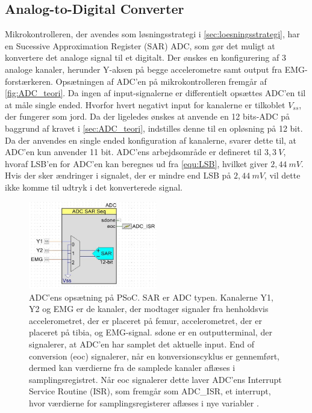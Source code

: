 \subsection{Analog-to-Digital Converter} \label{sec:ADC_imp}
Mikrokontrolleren, der avendes som løsningsstrategi i \autoref{sec:loesningsstrategi}, har en Sucessive Approximation Register (SAR) ADC, som gør det muligt at konvertere det analoge signal til et digitalt. Der ønskes en konfigurering af 3 analoge kanaler, herunder Y-aksen på begge accelerometre samt output fra EMG-forstærkeren. Opsætningen af ADC'en på mikrokontrolleren fremgår af \autoref{fig:ADC_teori}. Da ingen af input-signalerne er differentielt opsættes ADC'en til at måle single ended. Hvorfor hvert negativt input for kanalerne er tilkoblet $V_{ss}$, der fungerer som jord. Da der ligeledes ønskes at anvende en 12 bits-ADC på baggrund af kravet i \autoref{sec:ADC_teori}, indstilles denne til en opløsning på 12 bit. Da der anvendes en single ended konfiguration af kanalerne, svarer dette til, at ADC'en kun anvender 11 bit. ADC'ens arbejdsområde er defineret til $3,3~V$, hvoraf  LSB'en for ADC'en kan beregnes ud fra \autoref{equ:LSB}, hvilket giver $2,44~mV$. Hvis der sker ændringer i signalet, der er mindre end LSB på $2,44~mV$, vil dette ikke komme til udtryk i det konverterede signal. 


\begin{figure}[H]
\centering
\includegraphics[width=0.5\textwidth]{figures/implementering/ADC_imp.jpg}
\caption{ADC'ens opsætning på PSoC. SAR er ADC typen. Kanalerne Y1, Y2 og EMG er de kanaler, der modtager signaler fra henholdsvis accelerometret, der er placeret på femur, accelerometret, der er placeret på tibia, og EMG-signal. sdone er en outputterminal, der signalerer, at ADC'en har samplet det aktuelle input. End of conversion (eoc) signalerer, når en konversionscyklus er gennemført, dermed kan værdierne fra de samplede kanaler aflæses i samplingsregistret. Når eoc signalerer dette laver ADC'ens Interrupt Service Routine (ISR), som fremgår som ADC\_ISR, et interrupt, hvor værdierne for samplingsregisterer aflæses i nye variabler \citep{ADC2014}.}
\label{fig:ADC_teori}
\end{figure}

